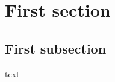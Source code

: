 \documentclass{article}
\begin{document}
\tableofcontents
\section{First section}
\localtableofcontents
\subsection{First subsection}
text
\end{document}
